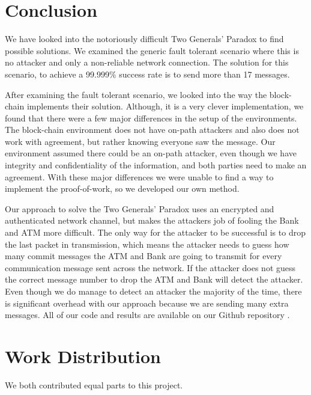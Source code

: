 \documentclass[10pt,letterpaper]{article}
\begin{document}
\begin{multicols}{2}
\section{Conclusion}

We have looked into the notoriously difficult Two Generals' Paradox to find possible solutions. We examined the generic fault tolerant scenario where this is no attacker and only a non-reliable network
connection. The solution for this scenario, to achieve a 99.999\% success rate is to send more than 17 messages.

After examining the fault tolerant scenario, we looked into the way the block-chain implements their solution. Although, it is a very clever implementation, we found that there were a few major differences
in the setup of the environments. The block-chain environment does not have on-path attackers and also does not work with agreement, but rather knowing everyone saw the message. Our environment assumed there
could be an on-path attacker, even though we have integrity and confidentiality of the information, and both parties need to make an agreement. With these major differences we were unable to find a way to
implement the proof-of-work, so we developed our own method.

Our approach to solve the Two Generals' Paradox uses an encrypted and authenticated network channel, but makes the attackers job of fooling the Bank and ATM more difficult. The only way for the attacker to
be successful is to drop the last packet in transmission, which means the attacker needs to guess how many commit messages the ATM and Bank are going to transmit for every communication message sent across
the network. If the attacker does not guess the correct message number to drop the ATM and Bank will detect the attacker. Even though we do manage to detect an attacker the majority of the time, there is significant overhead with our approach because we are sending many extra messages. All of our code and results are available on our Github repository \cite{west_essertel}.




{\raggedright
\small


}
\appendix
\section{Work Distribution}

We both contributed equal parts to this project.

\end{multicols}
\end{document}
